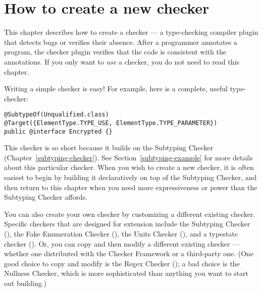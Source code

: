 \htmlhr
\chapter{How to create a new checker\label{writing-a-checker}}

\newcommand{\TreeAPIBase}{https://docs.oracle.com/javase/8/docs/jdk/api/javac/tree/com/sun/source}
\newcommand{\refTreeclass}[2]{\href{\TreeAPIBase{}/#1/#2.html?is-external=true}{\<#2>}}
\newcommand{\ModelAPIBase}{http://docs.oracle.com/javase/8/docs/api/javax/lang/model}
\newcommand{\refModelclass}[2]{\href{\ModelAPIBase{}/#1/#2.html?is-external=true}{\<#2>}}

This chapter describes how to create a checker
--- a type-checking compiler plugin that detects bugs or verifies their
absence.  After a programmer annotates a program,
the checker plugin verifies that the code is consistent
with the annotations.
If you only want to \emph{use} a checker, you do not need to read this
chapter.


Writing a simple checker is easy!  For example, here is a complete, useful
type-checker:

\begin{Verbatim}
@SubtypeOf(Unqualified.class)
@Target({ElementType.TYPE_USE, ElementType.TYPE_PARAMETER})
public @interface Encrypted {}
\end{Verbatim}

This checker is so short because it builds on the Subtyping Checker
(Chapter~\ref{subtyping-checker}).
See Section~\ref{subtyping-example} for more details about this particular checker.
When you wish to create a new checker, it is often easiest to begin by
building it declaratively on top of the Subtyping Checker, and then return to
this chapter when you need more expressiveness or power than the Subtyping
Checker affords.

You can also create your own checker by customizing a different existing
checker.  Specific checkers that are designed for extension include
the Subtyping Checker (),
the Fake Enumeration Checker (),
the Units Checker (),
 and a typestate checker ().
Or, you can copy and then modify a different existing checker --- whether
one distributed with the Checker Framework or a third-party one.
(One good choice to copy and modify is the Regex Checker
(); a bad choice is the Nullness Checker,
which is more sophisticated than anything you want to start out building.)

